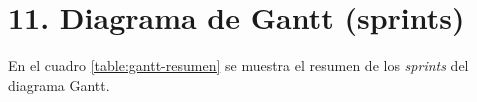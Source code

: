 \documentclass[
11pt, %
]{charter}
\begin{document}
\section{11. Diagrama de Gantt (sprints)}
\label{sec:gantt}













En el cuadro \ref{table:gantt-resumen} se muestra el resumen de los \textit{sprints} del diagrama Gantt.
\end{document}
